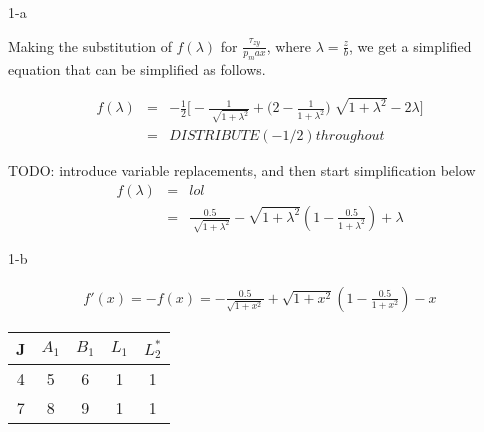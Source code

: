 \documentclass[11pt]{article}
\begin{document}
\begin{prob}{1-a}
\end{prob}
\begin{sol} 

Making the substitution of $f(\lambda)$ for $\frac{\tau_{zy}}{p_max}$, where $\lambda = \frac{z}{b}$, we get a simplified equation that can be simplified as follows.

\begin{eqnarray*}
f(\lambda) & = & -\frac{1}{2}\Bigg[ -\frac{1}{\sqrt[]{1 + \lambda^2}} +  \Bigg(2 - \frac{1}{1 + \lambda^2}\Bigg) \sqrt[]{1 + \lambda^2} -2\lambda \Bigg] \\
& = & DISTRIBUTE (-1/2) throughout
\end{eqnarray*}



TODO: introduce variable replacements, and then start simplification below
\begin{eqnarray*}
f(\lambda) & = & lol \\
& = & \frac{0.5}{\sqrt[]{1+\lambda^2}}-\sqrt{1+\lambda^2} \left(1-\frac{0.5}{1+\lambda^2}\right)+\lambda
\end{eqnarray*}

\end{sol}

\begin{prob}{1-b}
\end{prob}
\begin{sol} 

\begin{eqnarray*}
f'(x) = -f(x) =-\frac{0.5}{\sqrt{1+x^2}}+\sqrt{1+x^2} \left(1-\frac{0.5}{1+x^2}\right)-x 
\end{eqnarray*}


\begin{center}
  \begin{tabular}{| c | c | c | c | c |}
    \hline
    J & $A_{1}$ & $B_{1}$ & \textbf{$L_{1}$} & \textbf{$L_{2}^{*}$} \\ \hline
    4 & 5 & 6 & 1 & 1\\ \hline
    7 & 8 & 9 & 1 & 1\\
    \hline
  \end{tabular}
\end{center}

\end{sol}
\end{document}
